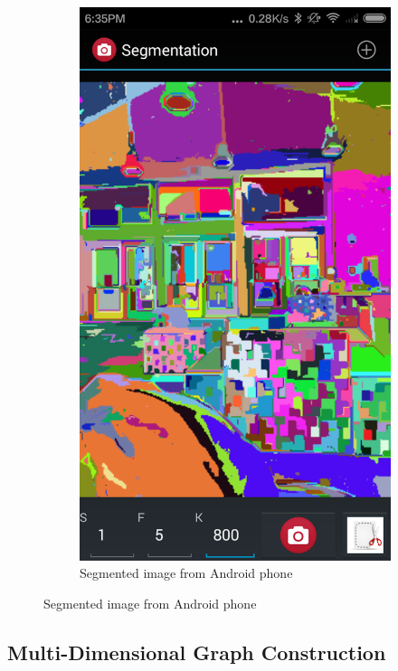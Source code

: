 \documentclass[12pt, english, titlepage]{article}
\begin{document}
\begin{figure}
\begin{subfigure}[b]{0.3\textwidth}
                \includegraphics[width=\textwidth]{./img/screenshSEG.png}
                \caption{Segmented image from Android phone}
                \label{ogs}
        \end{subfigure}
\end{figure}

\subsection{Multi-Dimensional Graph Construction}
\end{document}
